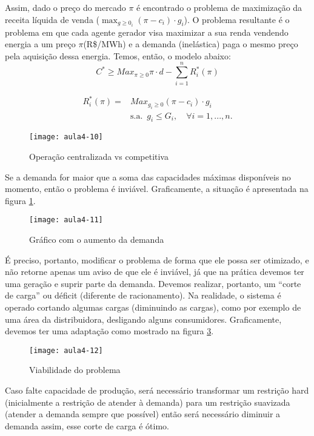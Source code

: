 Assim, dado o preço do mercado $\pi$ é encontrado o problema de maximização da receita líquida de venda ($\max_{g\geq0_{i}}(\pi-c_{i})\cdot g_{i}$).
O problema resultante é o problema em que cada agente gerador visa maximizar a sua renda vendendo energia a um preço $\pi$(R\$/MWh) e a demanda (inelástica) paga o mesmo preço pela aquisição dessa energia.
Temos, então, o modelo abaixo:
\[
C^{*}\geq Max_{\pi\geq0}\pi\cdot d-\sum_{i=1}^{n}R_{i}^{*}(\pi)
\]

\begin{align*}R_{i}^{*}(\pi)= & Max_{g_{i}\geq0}(\pi-c_{i})\cdot g_{i}\\
 & \mbox{s.a. }\,g_{i}\leq G_{i},\quad\forall i=1,...,n.
\end{align*}
 

\begin{figure}[H]
\begin{centering}
\texttt{[image: aula4-10]}\protect\caption{\label{fig:aula4-10} Operação centralizada vs competitiva}
\end{centering}
\end{figure}
Se a demanda for maior que a soma das capacidades máximas disponíveis no momento, então o
problema é inviável. Graficamente, a situação é apresentada na figura \ref{fig:aula4-10}. 
\begin{figure}[H]
\begin{centering}
\texttt{[image: aula4-11]}\protect\caption{\label{fig:aula4-11} Gráfico com o aumento da demanda}
\end{centering}
\end{figure}
É preciso, portanto, modificar o problema de forma que ele possa ser otimizado, e não retorne apenas um aviso de que ele é inviável, já que na prática devemos ter uma geração e suprir parte da demanda. Devemos realizar, portanto, um ``corte de carga'' ou déficit (diferente de racionamento). Na realidade, o sistema é operado cortando algumas cargas (diminuindo as cargas), como por exemplo de uma área da distribuidora, desligando alguns consumidores. Graficamente, devemos ter uma adaptação como mostrado na figura \ref{fig:aula4-12}.
\begin{figure}[H]
\begin{centering}
\texttt{[image: aula4-12]}\protect\caption{\label{fig:aula4-12} Viabilidade do problema}
\end{centering}
\end{figure}
Caso falte capacidade de produção, será necessário transformar um restrição hard (inicialmente a restrição de atender à demanda) para um restrição suavizada (atender a demanda sempre que possível) então será necessário diminuir a demanda assim, esse corte de carga é ótimo. 
